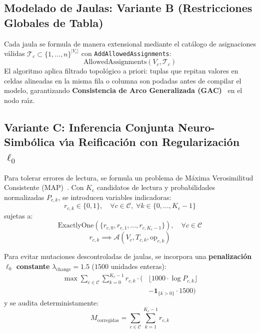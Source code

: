 \documentclass[conference]{IEEEtran}
\begin{document}
\subsection{Modelado de Jaulas: Variante B (Restricciones Globales de Tabla)}
Cada jaula se formula de manera extensional mediante el cat\'alogo de asignaciones v\'alidas $\mathcal{T}_c \subset \{1, \dots, n\}^{|V_c|}$ con \texttt{AddAllowedAssignments}:
\begin{equation}
    \text{AllowedAssignments}(V_c, \mathcal{T}_c)
    \label{eq:table_constraint}
\end{equation}
El algoritmo aplica filtrado topol\'ogico a priori: tuplas que repitan valores en celdas alineadas en la misma fila o columna son podadas antes de compilar el modelo, garantizando \textbf{Consistencia de Arco Generalizada (GAC)}~\cite{bessiere2006table} en el nodo ra\'{\i}z.

\subsection{Variante C: Inferencia Conjunta Neuro-Simb\'olica v\'{\i}a Reificaci\'on con Regularizaci\'on \texorpdfstring{$\ell_0$}{L0}}
Para tolerar errores de lectura, se formula un problema de M\'axima Verosimilitud Consistente (MAP)~\cite{deraedt2011constraint}. Con $K_c$ candidatos de lectura y probabilidades normalizadas $P_{c,k}$, se introducen variables indicadoras:
\begin{equation}
    r_{c,k} \in \{0, 1\}, \quad \forall c \in \mathcal{C}, \; \forall k \in \{0, \dots, K_c - 1\}
\end{equation}
sujetas a:
\begin{equation}
    \text{ExactlyOne}(\{r_{c,0}, r_{c,1}, \dots, r_{c,K_c - 1}\}), \quad \forall c \in \mathcal{C}
\end{equation}
\begin{equation}
    r_{c,k} \implies \mathcal{A}(V_c, T_{c,k}, \text{op}_{c,k})
\end{equation}

Para evitar mutaciones descontroladas de jaulas, se incorpora una \textbf{penalizaci\'on $\ell_0$ constante} $\lambda_{\text{change}} = 1.5$ ($1500$ unidades enteras):
\begin{equation}
\begin{aligned}
    \max \sum_{c \in \mathcal{C}} \sum_{k=0}^{K_c - 1} r_{c,k} \cdot \Big( & \lfloor 1000 \cdot \log P_{c,k} \rfloor \\
    & - \mathbf{1}_{\{k > 0\}} \cdot 1500 \Big)
\end{aligned}
\label{eq:map_objective_l0}
\end{equation}
y se audita deterministamente:
\begin{equation}
    M_{\text{corregidas}} = \sum_{c \in \mathcal{C}} \sum_{k=1}^{K_c - 1} r_{c,k}
\end{equation}
\end{document}
